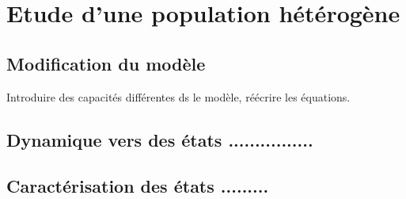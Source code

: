 \chapter{Etude d'une population hétérogène}

\section{Modification du modèle}

Introduire des capacités différentes ds le modèle, réécrire les équations.

\section{Dynamique vers des états ................}

\section{Caractérisation des états .........}